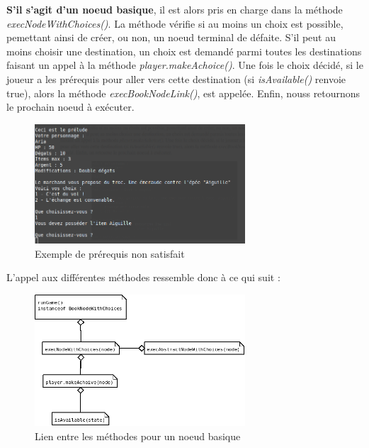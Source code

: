 			\textbf{S'il s'agit d'un noeud basique}, il est alors pris en charge dans la méthode \textit{execNodeWithChoices()}. La méthode vérifie si au moins un choix est possible, pemettant ainsi de créer, ou non, un noeud terminal de défaite. S'il peut au moins choisir une destination, un choix est demandé parmi toutes les destinations faisant un appel à la méthode \textit{player.makeAchoice()}. Une fois le choix décidé, si le joueur a les prérequis pour aller vers cette destination (si \textit{isAvailable()} renvoie true), alors la méthode \textit{execBookNodeLink()}, est appelée. Enfin, nouss retournons le prochain noeud à exécuter.

			\begin{figure}[H]
				\centering\includegraphics[width=0.70\textwidth]{img/codeJeuPrerequis.png}
				\caption{Exemple de prérequis non satisfait}
				\label{fig:codeJeuPrerequis}
			\end{figure}

			L'appel aux différentes méthodes ressemble donc à ce qui suit :

			\begin{figure}[H]
				\centering\includegraphics[width=0.70\textwidth]{img/JeuBookNodeWithChoices.png}
				\caption{Lien entre les méthodes pour un noeud basique}
				\label{fig:JeuBookNodeWithChoices}
			\end{figure}

